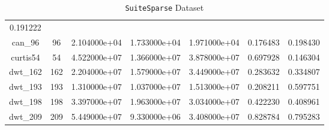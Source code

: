 \begin{table}[h]
\begin{tabular}{ccccccc}
    0.191222\\
    can\_96 & 96 & 2.104000e+04 & 1.733000e+04 & 1.971000e+04 & 0.176483 &
    0.198430\\
    curtis54 & 54 & 4.522000e+07 & 1.366000e+07 & 3.878000e+07 & 0.697928 &
    0.146304\\
    dwt\_162 & 162 & 2.204000e+07 & 1.579000e+07 & 3.449000e+07 & 0.283632 &
    0.334807\\
    dwt\_193 & 193 & 1.310000e+07 & 1.037000e+07 & 1.513000e+07 & 0.208211 &
    0.597751\\
    dwt\_198 & 198 & 3.397000e+07 & 1.963000e+07 & 3.034000e+07 & 0.422230 &
    0.408961\\
    dwt\_209 & 209 & 5.449000e+07 & 9.330000e+06 & 3.408000e+07 & 0.828784 &
    0.795283\\
    \hline
  \end{tabular}
  \caption{\texttt{SuiteSparse} Dataset}
\end{table}

